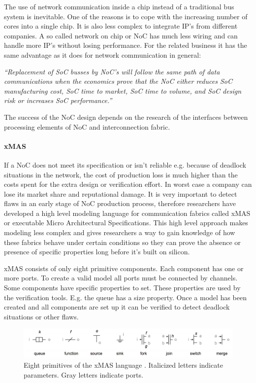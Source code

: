 The use of network communication inside a chip instead of a traditional bus
system is inevitable. One of the reasons is to cope with the increasing number
of cores into a single chip. It is also less complex to integrate IP's from
different companies. A so called network on chip or NoC has much less wiring
\cite{NoC-busses} and can handle more IP's without losing performance. For the
related business it has the same advantage as it does for network communication
in general:

\textit{``Replacement of SoC busses by NoC's will follow the same path of data
communications when the economics prove that the NoC either reduces SoC
manufacturing cost, SoC time to market, SoC time to volume, and SoC design risk
or increases SoC performance.''} \cite{NoC-busses} 

The success of the NoC design depends on the research of the interfaces between
processing elements of NoC and interconnection fabric.

\paragraph{xMAS}

If a NoC does not meet its specification or isn't reliable e.g. because of
deadlock situations in the network, the cost of production loss is much higher
than the costs spent for the extra design or verification effort. In worst case
a company can lose its market share and reputational damage. It is very
important to detect flaws in an early stage of NoC production process, therefore
researchers have developed a high level modeling language for communication
fabrics called xMAS or executable Micro Architectural Specifications. This high
level approach makes modeling less complex and gives researchers a way to gain
knowledge of how these fabrics behave under certain conditions so they can prove
the absence or presence of specific properties long before it's built on
silicon.

xMAS consists of only eight primitive components. Each component has one or more
ports. To create a valid model all ports must be connected by channels. Some
components have specific properties to set. These properties are used by the
verification tools. E.g. the queue has a size property. Once a model has been
created and all components are set up it can be verified to detect deadlock
situations or other flaws.

\begin{figure}[here]
\includegraphics[width=1.0\textwidth]{xmas-language}
\caption{Eight primitives of the xMAS language \cite{6225465}. Italicized letters indicate
parameters. Gray letters indicate ports.}
\label{fig:xmas-language}
\end{figure}

